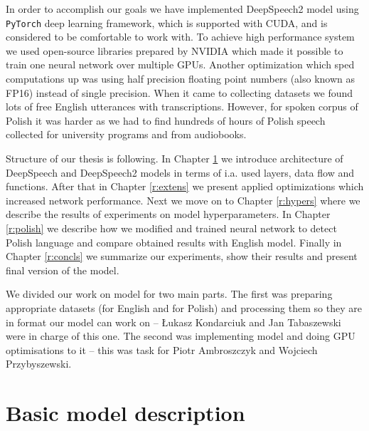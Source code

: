 \documentclass[licencjacka,en]{pracamgr}
\begin{document}
In order to accomplish our goals we have implemented DeepSpeech2 model using \texttt{PyTorch} deep learning framework, which is supported with CUDA, and is considered to be comfortable to work with. To achieve high performance system we used open-source libraries prepared by NVIDIA which made it possible to train one neural network over multiple GPUs. Another optimization which sped computations up was using half precision floating point numbers (also known as FP16) instead of single precision.  When it came to collecting datasets we found lots of free English utterances with transcriptions. However, for spoken corpus of Polish it was harder as we had to find hundreds of hours of Polish speech collected for university programs and from audiobooks.

Structure of our thesis is following. In Chapter \ref{r:desc} we introduce architecture of DeepSpeech and DeepSpeech2 models in terms of i.a. used layers, data flow and functions. After that in Chapter \ref{r:extens} we present applied optimizations which increased network performance. Next we move on to Chapter \ref{r:hypers} where we describe the results of experiments on model hyperparameters. In Chapter \ref{r:polish} we describe how we modified and trained neural network to detect Polish language and compare obtained results with English model. Finally in Chapter \ref{r:concls} we summarize our experiments, show their results and present final version of the model.    

We divided our work on model for two main parts. The first was preparing appropriate datasets (for English and for Polish) and processing them so they are in format our model can work on -- Łukasz Kondarciuk and Jan Tabaszewski were in charge of this one. The second was implementing model and doing GPU optimisations to it -- this was task for Piotr Ambroszczyk and Wojciech Przybyszewski.
\chapter{Basic model description}\label{r:desc}
\end{document}
